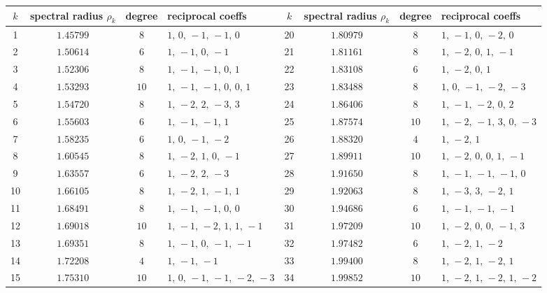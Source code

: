 \documentclass[11pt]{amsart}
\numberwithin{equation}{section}
\begin{document}
\begin{appendices}
{\footnotesize{
\begin{table}[h]
\centering
\begin{tabular}{|c|c|c|l||c|c|c|l|}
\hline
$k$ & spectral radius $\rho_k$ & degree & reciprocal coeffs  
& $k$ & spectral radius $\rho_k$ & degree & reciprocal coeffs  \\ \hline\hline
1 & $1.45799$ & $8$ & $  1,\,   0,\, -1,\, -1,\,   0$ &20 & $1.80979$ & $8$ & $  1,\, -1,\,   0,\, -2,\,   0$ \\
2 & $1.50614$ & $6$ & $  1,\, -1,\,   0,\, -1$ &21 & $1.81161$ & $8$ & $  1,\, -2,\,   0,\,   1,\, -1$ \\
3 & $1.52306$ & $8$ & $  1,\, -1,\, -1,\,   0,\,   1$ &22 & $1.83108$ & $6$ & $  1,\, -2,\,   0,\,   1$ \\
4 & $1.53293$ & $10$ & $  1,\, -1,\, -1,\,   0,\,   0,\,   1$ &23 & $1.83488$ & $8$ & $  1,\,   0,\, -1,\, -2,\, -3$ \\
5 & $1.54720$ & $8$ & $  1,\, -2,\,   2,\, -3,\,   3$ &24 & $1.86406$ & $8$ & $  1,\, -1,\, -2,\,   0,\,   2$ \\
6 & $1.55603$ & $6$ & $  1,\, -1,\, -1,\,   1$ &25 & $1.87574$ & $10$ & $  1,\, -2,\, -1,\,   3,\,   0,\, -3$ \\
7 & $1.58235$ & $6$ & $  1,\,   0,\, -1,\, -2$ &26 & $1.88320$ & $4$ & $  1,\, -2,\,   1$ \\
8 & $1.60545$ & $8$ & $  1,\, -2,\,   1,\,   0,\, -1$ &27 & $1.89911$ & $10$ & $  1,\, -2,\,   0,\,   0,\,   1,\, -1$ \\
9 & $1.63557$ & $6$ & $  1,\, -2,\,   2,\, -3$ &28 & $1.91650$ & $8$ & $  1,\, -1,\, -1,\, -1,\,   0$ \\
10 & $1.66105$ & $8$ & $  1,\, -2,\,   1,\, -1,\,   1$ &29 & $1.92063$ & $8$ & $  1,\, -3,\,   3,\, -2,\,   1$ \\
11 & $1.68491$ & $8$ & $  1,\, -1,\, -1,\,   0,\,   0$ &30 & $1.94686$ & $6$ & $  1,\, -1,\, -1,\, -1$ \\
12 & $1.69018$ & $10$ & $  1,\, -1,\, -2,\,   1,\,   1,\, -1$ &31 & $1.97209$ & $10$ & $  1,\, -2,\,   0,\,   0,\, -1,\,   3$ \\
13 & $1.69351$ & $8$ & $  1,\, -1,\,   0,\, -1,\, -1$  &32 & $1.97482$ & $6$ & $  1,\, -2,\,   1,\, -2$ \\
14 & $1.72208$ & $4$ & $  1,\, -1,\, -1$ &33 & $1.99400$ & $8$ & $  1,\, -2,\,   1,\, -2,\,   1$ \\
15 & $1.75310$ & $10$ & $  1,\,   0,\, -1,\, -1,\, -2,\, -3$ &34 & $1.99852$ & $10$ & $  1,\, -2,\,   1,\, -2,\,   1,\, -2$ \\

\end{tabular}
\end{table}}}
\end{appendices}
\end{document}
